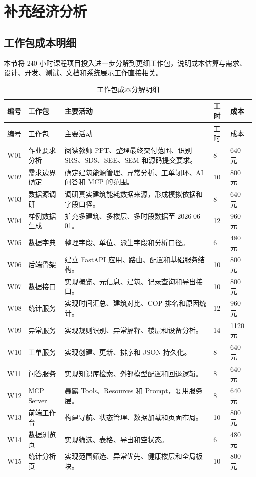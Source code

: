 \documentclass[12pt,a4paper]{ctexart}
\begin{document}
\clearpage
\section{补充经济分析}
\subsection{工作包成本明细}
本节将 240 小时课程项目投入进一步分解到更细工作包，说明成本估算与需求、设计、开发、测试、文档和系统展示工作直接相关。
\begin{longtable}{L{1.5cm}L{3.2cm}L{5.8cm}L{1.6cm}L{2.4cm}}
\caption{工作包成本分解明细}\\
\toprule
编号 & 工作包 & 主要活动 & 工时 & 成本 \\
\midrule
\endfirsthead
\toprule
编号 & 工作包 & 主要活动 & 工时 & 成本 \\
\midrule
\endhead
W01 & 作业要求分析 & 阅读教师 PPT、整理最终交付范围、识别 SRS、SDS、SEE、SEM 和源码提交要求。 & 8 & 640 元 \\
W02 & 需求边界确定 & 确定建筑能源管理、异常分析、工单闭环、AI 问答和 MCP 的范围。 & 10 & 800 元 \\
W03 & 数据源调研 & 调研真实建筑能耗数据来源，形成模拟依据和字段口径。 & 8 & 640 元 \\
W04 & 样例数据生成 & 扩充多建筑、多楼层、多时段数据至 2026-06-01。 & 12 & 960 元 \\
W05 & 数据字典 & 整理字段、单位、派生字段和分析口径。 & 6 & 480 元 \\
W06 & 后端骨架 & 建立 FastAPI 应用、路由、配置和基础服务结构。 & 10 & 800 元 \\
W07 & 数据接口 & 实现概览、元信息、建筑、记录查询和导出接口。 & 10 & 800 元 \\
W08 & 统计服务 & 实现时间汇总、建筑对比、COP 排名和原因统计。 & 12 & 960 元 \\
W09 & 异常服务 & 实现规则识别、异常解释、楼层和设备分析。 & 14 & 1120 元 \\
W10 & 工单服务 & 实现创建、更新、排序和 JSON 持久化。 & 8 & 640 元 \\
W11 & 问答服务 & 实现知识库检索、外部模型配置和回退逻辑。 & 8 & 640 元 \\
W12 & MCP Server & 暴露 Tools、Resources 和 Prompt，复用服务层。 & 8 & 640 元 \\
W13 & 前端工作台 & 构建导航、状态管理、数据加载和页面布局。 & 10 & 800 元 \\
W14 & 数据浏览页 & 实现筛选、表格、导出和空状态。 & 6 & 480 元 \\
W15 & 统计分析页 & 实现范围筛选、异常优先、健康楼层和全局板块。 & 10 & 800 元 \\

\end{longtable}
\end{document}
